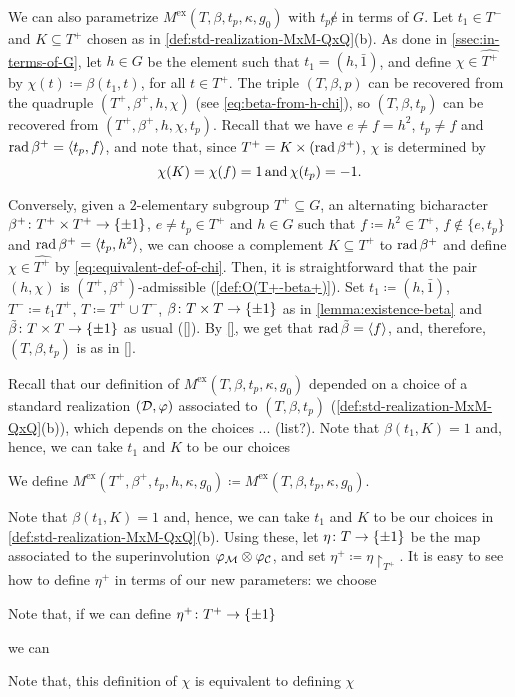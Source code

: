 We can also parametrize $M^{\mathrm{ex}}(T, \beta, t_p, \kappa, g_0)$ with $t_p \not e$ in terms of $G$. 
Let $t_1 \in T^-$ and $K \subseteq T^+$ chosen as in \cref{def:std-realization-MxM-QxQ}(b). 
As done in \cref{ssec:in-terms-of-G}, let $h \in G$ be the element such that $t_1 = (h, \bar 1)$, and define $\chi \in \widehat{T^+}$ by $\chi(t) \coloneqq \beta(t_1, t)$, for all $t\in T^+$. 
The triple $(T, \beta, p)$ can be recovered from the quadruple $(T^+, \beta^+, h, \chi)$ (see \cref{eq:beta-from-h-chi}), so $(T, \beta, t_p)$ can be recovered from $(T^+, \beta^+, h, \chi, t_p)$. 
Recall that we have $e \neq f = h^2$, $t_p \neq f$ and $\operatorname{rad} \beta^+ = \langle t_p, f \rangle$, and note that, since $T^+ = K \times (\operatorname{rad} \beta^+)$, $\chi$ is determined by 
\[\label{eq:equivalent-def-of-chi}
    \chi(K) = \chi(f) = 1 \,\text{and}\, \chi(t_p) = -1.
\]

Conversely, given a $2$-elementary subgroup $T^+ \subseteq G$, an alternating bicharacter $\beta^+\colon T^+ \times T^+ \to \{ \pm 1 \}$, $e \neq t_p \in T^+$ and $h\in G$ such that $f\coloneqq h^2 \in T^+$, $f \not\in \{e, t_p \}$ and $\operatorname{rad} \beta^+ = \langle t_p, h^2 \rangle$, we can choose a complement $K \subseteq T^+$ to $\operatorname{rad} \beta^+$ and define $\chi \in \widehat{T^+}$ by \cref{eq:equivalent-def-of-chi}. 
Then, it is straightforward that the pair $(h, \chi)$ is $(T^+, \beta^+)$-admissible (\cref{def:O(T+-beta+)}). 
Set $t_1 \coloneqq (h, \bar 1)$, $T^- \coloneqq t_1 T^+$, $T \coloneqq T^+ \cup T^-$, $\beta\colon T\times T\to \{ \pm 1 \}$ as in \cref{lemma:existence-beta} and $\tilde\beta\colon T\times T\to \{ \pm 1 \}$ as usual (\cref{}).  
By \cref{}, we get that $\operatorname{rad} \tilde\beta = \langle f \rangle$, and, therefore, $(T, \beta, t_p)$ is as in \cref{}. 

Recall that our definition of $M^{\mathrm{ex}}(T, \beta, t_p, \kappa, g_0)$ depended on a choice of a standard realization $(\mathcal{D}, \varphi)$ associated to $(T, \beta, t_p)$ (\cref{def:std-realization-MxM-QxQ}(b)), which depends on the choices ... (list?). 
Note that $\beta(t_1, K) = 1$ and, hence, we can take $t_1$ and $K$ to be our choices


We define $M^{\mathrm{ex}}(T^+, \beta^+, t_p, h, \kappa, g_0) \coloneqq M^{\mathrm{ex}}(T, \beta, t_p, \kappa, g_0)$. 

Note that $\beta(t_1, K) = 1$ and, hence, we can take $t_1$ and $K$ to be our choices in \cref{def:std-realization-MxM-QxQ}(b). 
Using these, let $\eta \colon T \to \{ \pm 1 \}$ be the map associated to the superinvolution $\varphi_{\mathcal M} \otimes \varphi_{\mathcal C}$, and set $\eta^+ \coloneqq \eta\restriction_{T^+}$. 
It is easy to see how to define $\eta^+$ in terms of our new parameters: we choose 



Note that, if  we can define $\eta^+\colon T^+ \to \{ \pm 1 \}$




we can

Note that, this definition of $\chi$ is equivalent to defining $\chi$